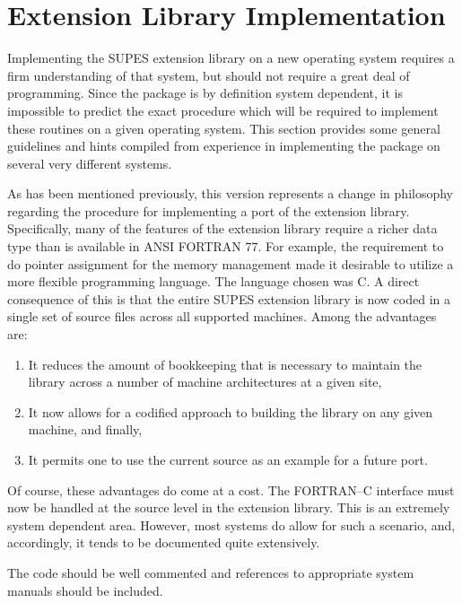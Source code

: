 \section{Extension Library Implementation}
Implementing the SUPES extension library on a new operating system
requires a firm understanding of that system, but should not require a great
deal of programming.  Since the package is by definition system dependent,
it is impossible to predict the exact procedure which will be required to
implement these routines on a given operating system.  This section provides
some general guidelines and hints compiled from experience in implementing
the package on several very different systems.

As has been mentioned previously,
this version represents a change in philosophy regarding the procedure
for implementing a port of the extension library.
Specifically,
many of the features of the extension library require a
richer data type than is available in ANSI FORTRAN 77.
For example,
the requirement to do pointer assignment for the memory management
made it desirable to utilize a more flexible programming
language.
The language chosen was C\@.
A direct consequence of this is that the
entire SUPES extension library is now coded in a single
set of source files across all supported machines.
Among the advantages are:
\begin{enumerate}

\item It reduces the amount of bookkeeping that is necessary to maintain
      the library across a number of machine architectures at a given
      site,

\item It now allows for a codified approach
      to building the library on any given machine, and finally,

\item It permits one to use the current source as an example for a
      future port.

\end{enumerate}

Of course, these advantages do come at a cost.  The FORTRAN--C
interface must now be handled at the source level in the extension
library.  This is an extremely system dependent area.  However, most
systems do allow for such a scenario, and, accordingly, it tends to be
documented quite extensively.

The code should be well commented and references to appropriate system
manuals should be included.

